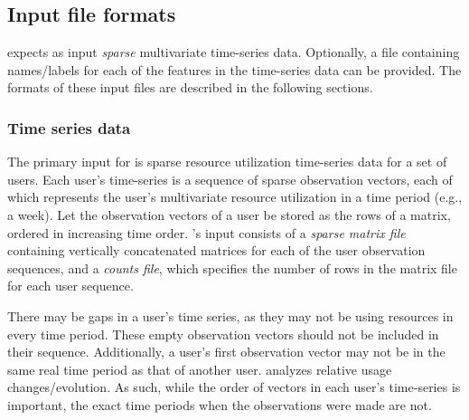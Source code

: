 \documentclass[]{article}
\begin{document}
\subsection{Input file formats}
\label{sec:usage:iformat}

\orion expects as input \emph{sparse} multivariate time-series data.
Optionally, a file containing names/labels for each of the features in the
time-series data can be provided. The formats of these input files are described
in the following sections.

\subsubsection{Time series data}
\label{sec:usage:iformat:ts}

The primary input for \orion is sparse resource utilization time-series data for
a set of users. Each user's time-series is a sequence of sparse observation
vectors, each of which represents the user's multivariate resource utilization
in a time period (e.g., a week). Let the observation vectors of a user be stored
as the rows of a matrix, ordered in increasing time order. \orion's input
consists of a \emph{sparse matrix file} containing vertically concatenated
matrices for each of the user observation sequences, and a \emph{counts file},
which specifies the number of rows in the matrix file for each user sequence.

There may be gaps in a user's time series, as they may not be using
resources in every time period. These empty observation vectors should not be
included in their sequence. Additionally, a user's first observation vector may
not be in the same real time period as that of another user. \orion analyzes
relative usage changes/evolution. As such, while the order of vectors in each
user's time-series is important, the exact time periods when the observations
were made are not.
\end{document}
